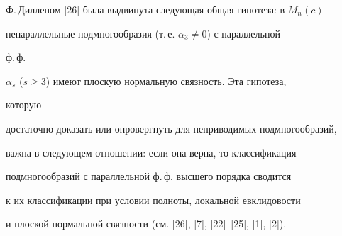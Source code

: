 Ф.\,Дилленом [26] была выдвинута следующая общая гипотеза: в $M_n(c)$


непараллельные подмногообразия (т.\,е. $\alpha_3\ne 0$) с параллельной


ф.\,ф.


$\alpha_s$ ($s\ge 3$) имеют плоскую нормальную связность. Эта гипотеза,


которую


достаточно доказать или опровергнуть для неприводимых подмногообразий,


важна в следующем отношении: если она верна, то классификация


подмногообразий с параллельной ф.\,ф. высшего порядка сводится


к их классификации при условии полноты, локальной евклидовости


и плоской нормальной связности (см. [26], [7], [22]--[25], [1], [2]).





